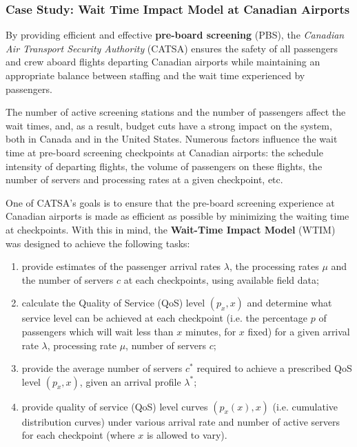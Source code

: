 \subsubsection{Case Study: Wait Time Impact Model at Canadian Airports}
By providing efficient and effective \textbf{pre-board screening} (PBS), the \textit{Canadian Air Transport Security Authority} (CATSA) ensures the safety of all passengers and crew aboard flights departing Canadian airports while maintaining an appropriate balance between staffing and the wait time experienced by passengers. \par The number of active screening stations and the number of passengers affect the wait times, and, as a result, budget cuts have a strong impact on the system, both in Canada and in the United States.\newpage\noindent
Numerous factors influence the wait time at pre-board screening checkpoints at Canadian airports: the schedule intensity of departing flights, the volume of passengers on these flights, the number of servers and processing rates at a given checkpoint, etc. \par One of CATSA's goals is to ensure that the pre-board screening experience at Canadian airports is made as efficient as possible by minimizing the waiting time at checkpoints. With this in mind, the \textbf{Wait-Time Impact Model} (WTIM) was designed to achieve the following tasks: 
\begin{enumerate}[noitemsep]
\item provide estimates of the passenger arrival rates $\lambda$, the processing rates $\mu$ and the number of servers $c$ at each checkpoints, using available field data;
\item calculate the Quality of Service (QoS) level $(p_x,x)$  and determine what service level can be achieved at each checkpoint (i.e. the percentage $p$ of passengers which will wait less than $x$ minutes, for $x$ fixed) for a given arrival rate $\lambda$, processing rate $\mu$, number of servers $c$;
\item provide the average number of servers $c^*$ required to achieve a prescribed QoS level $(p_x,x)$, given an arrival profile $\lambda^*$;
\item provide quality of service (QoS) level curves $(p_x (x),x)$ (i.e. cumulative distribution curves) under various arrival rate and number of active servers for each checkpoint (where $x$ is allowed to vary).\end{enumerate}
